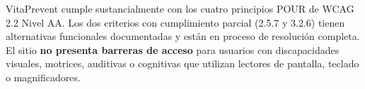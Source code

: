 \documentclass[12pt, a4paper]{article}
\begin{document}
\begin{okbox}
VitaPrevent cumple sustancialmente con los cuatro principios POUR de WCAG 2.2 Nivel AA. Los dos criterios con cumplimiento parcial (2.5.7 y 3.2.6) tienen alternativas funcionales documentadas y están en proceso de resolución completa. El sitio \textbf{no presenta barreras de acceso} para usuarios con discapacidades visuales, motrices, auditivas o cognitivas que utilizan lectores de pantalla, teclado o magnificadores.
\end{okbox}
\end{document}
